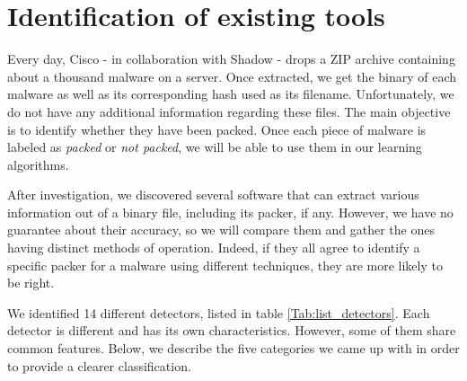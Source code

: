 \section{Identification of existing tools}
Every day, Cisco - in collaboration with Shadow \cite{shadow} - drops a ZIP archive containing about a thousand malware on a server. Once extracted, we get the binary of each malware as well as its corresponding hash used as its filename. Unfortunately, we do not have any additional information regarding these files. The main objective is to identify whether they have been packed. Once each piece of malware is labeled as \textit{packed} or \textit{not packed}, we will be able to use them in our learning algorithms.

After investigation, we discovered several software that can extract various information out of a binary file, including its packer, if any. However, we have no guarantee about their accuracy, so we will compare them and gather the ones having distinct methods of operation. Indeed, if they all agree to identify a specific packer for a malware using different techniques, they are more likely to be right.

We identified 14 different detectors, listed in table \ref{Tab:list_detectors}. Each detector is different and has its own characteristics. However, some of them share common features. Below, we describe the five categories we came up with in order to provide a clearer classification.

